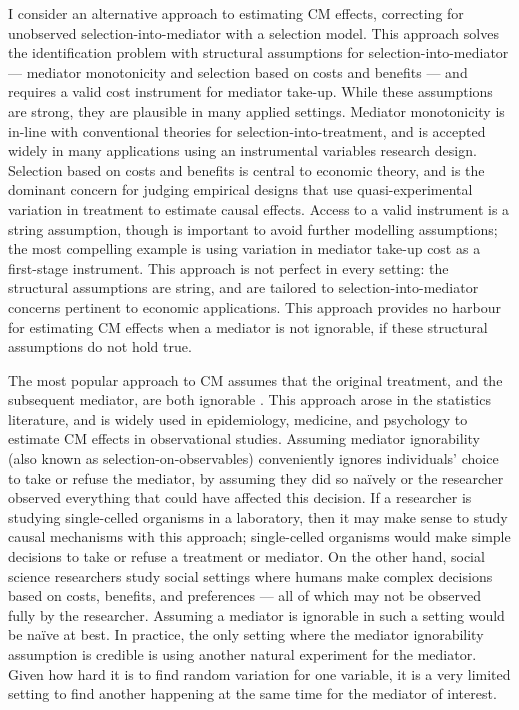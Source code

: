 I consider an alternative approach to estimating CM effects, correcting for unobserved selection-into-mediator with a selection model.
This approach solves the identification problem with structural assumptions for selection-into-mediator --- mediator monotonicity and selection based on costs and benefits --- and requires a valid cost instrument for mediator take-up.
While these assumptions are strong, they are plausible in many applied settings.
Mediator monotonicity is in-line with conventional theories for selection-into-treatment, and is accepted widely in many applications using an instrumental variables research design.
Selection based on costs and benefits is central to economic theory, and is the dominant concern for judging empirical designs that use quasi-experimental variation in treatment to estimate causal effects.
Access to a valid instrument is a string assumption, though is important to avoid further modelling assumptions; the most compelling example is using variation in mediator take-up cost as a first-stage instrument.
This approach is not perfect in every setting: the structural assumptions are string, and are tailored to selection-into-mediator concerns pertinent to economic applications.
This approach provides no harbour for estimating CM effects when a mediator is not ignorable, if these structural assumptions do not hold true.

The most popular approach to CM assumes that the original treatment, and the subsequent mediator, are both ignorable \citep{imai2010identification}.
This approach arose in the statistics literature, and is widely used in epidemiology, medicine, and psychology to estimate CM effects in observational studies.
Assuming mediator ignorability (also known as selection-on-observables) conveniently ignores individuals' choice to take or refuse the mediator, by assuming they did so na\"ively or the researcher observed everything that could have affected this decision.
If a researcher is studying single-celled organisms in a laboratory, then it may make sense to study causal mechanisms with this approach; single-celled organisms would make simple decisions to take or refuse a treatment or mediator.
On the other hand, social science researchers study social settings where humans make complex decisions based on costs, benefits, and preferences --- all of which may not be observed fully by the researcher.
Assuming a mediator is ignorable in such a setting would be na\"ive at best.
In practice, the only setting where the mediator ignorability assumption is credible is using another natural experiment for the mediator.
Given how hard it is to find random variation for one variable, it is a very limited setting to find another happening at the same time for the mediator of interest.

